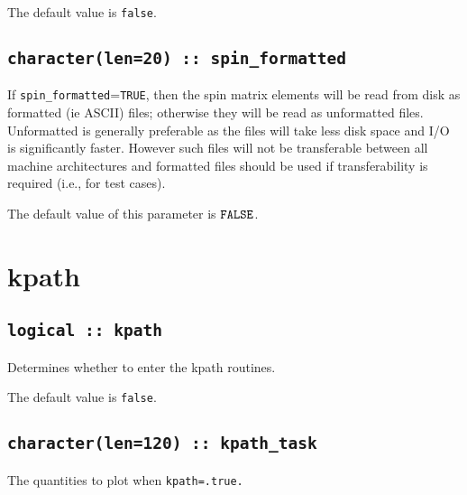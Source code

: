 The default value is \verb#false#.

\subsection[spin\_formated]{\tt character(len=20) :: spin\_formatted}

If \verb#spin_formatted#=\verb#TRUE#, then the spin matrix elements will be
read from disk as formatted (ie ASCII) files; otherwise they will be
read as unformatted files. Unformatted is generally preferable as the
files will take less disk space and I/O is significantly
faster. However such files will not be transferable between all
machine architectures and formatted files should be used if
transferability is required (i.e., for test cases).

The default value of this parameter is $\verb#FALSE#$.


\clearpage
\section{kpath}

\subsection[berry]{\tt logical :: kpath}
Determines whether to enter the kpath routines.

The default value is \verb#false#.


\subsection[kpath\_task]{\tt character(len=120) ::  kpath\_task} 
The quantities to plot when {\tt kpath=.true.} 


